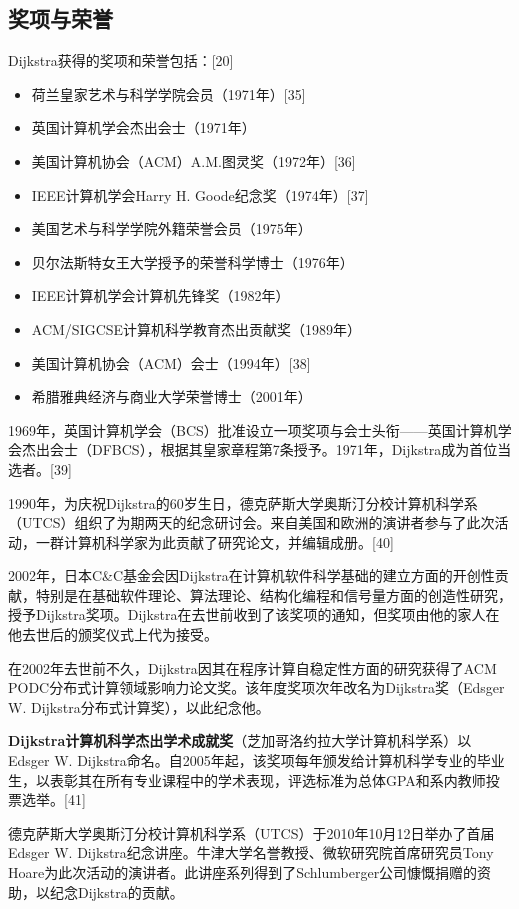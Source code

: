 \subsection{奖项与荣誉}

Dijkstra获得的奖项和荣誉包括：[20]
\begin{itemize}
\item 荷兰皇家艺术与科学学院会员（1971年）[35]
\item 英国计算机学会杰出会士（1971年）
\item 美国计算机协会（ACM）A.M.图灵奖（1972年）[36]
\item IEEE计算机学会Harry H. Goode纪念奖（1974年）[37]
\item 美国艺术与科学学院外籍荣誉会员（1975年）
\item 贝尔法斯特女王大学授予的荣誉科学博士（1976年）
\item IEEE计算机学会计算机先锋奖（1982年）
\item ACM/SIGCSE计算机科学教育杰出贡献奖（1989年）
\item 美国计算机协会（ACM）会士（1994年）[38]
\item 希腊雅典经济与商业大学荣誉博士（2001年）
\end{itemize}
1969年，英国计算机学会（BCS）批准设立一项奖项与会士头衔——英国计算机学会杰出会士（DFBCS），根据其皇家章程第7条授予。1971年，Dijkstra成为首位当选者。[39]

1990年，为庆祝Dijkstra的60岁生日，德克萨斯大学奥斯汀分校计算机科学系（UTCS）组织了为期两天的纪念研讨会。来自美国和欧洲的演讲者参与了此次活动，一群计算机科学家为此贡献了研究论文，并编辑成册。[40]

2002年，日本C&C基金会因Dijkstra在计算机软件科学基础的建立方面的开创性贡献，特别是在基础软件理论、算法理论、结构化编程和信号量方面的创造性研究，授予Dijkstra奖项。Dijkstra在去世前收到了该奖项的通知，但奖项由他的家人在他去世后的颁奖仪式上代为接受。

在2002年去世前不久，Dijkstra因其在程序计算自稳定性方面的研究获得了ACM PODC分布式计算领域影响力论文奖。该年度奖项次年改名为Dijkstra奖（Edsger W. Dijkstra分布式计算奖），以此纪念他。

\textbf{Dijkstra计算机科学杰出学术成就奖}（芝加哥洛约拉大学计算机科学系）以Edsger W. Dijkstra命名。自2005年起，该奖项每年颁发给计算机科学专业的毕业生，以表彰其在所有专业课程中的学术表现，评选标准为总体GPA和系内教师投票选举。[41]

德克萨斯大学奥斯汀分校计算机科学系（UTCS）于2010年10月12日举办了首届Edsger W. Dijkstra纪念讲座。牛津大学名誉教授、微软研究院首席研究员Tony Hoare为此次活动的演讲者。此讲座系列得到了Schlumberger公司慷慨捐赠的资助，以纪念Dijkstra的贡献。
